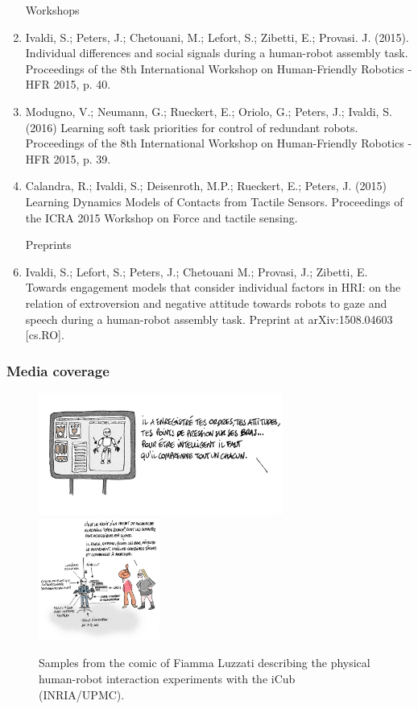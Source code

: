 \begin{enumerate}
\item[Workshops]

\item Ivaldi, S.; Peters, J.;  Chetouani, M.;  Lefort, S.; Zibetti, E.; Provasi. J. (2015). Individual differences and social signals during a human-robot assembly task. Proceedings of the 8th International Workshop on Human-Friendly Robotics - HFR 2015, p. 40.

\item Modugno, V.; Neumann, G.; Rueckert, E.; Oriolo, G.; Peters, J.; Ivaldi, S. (2016) Learning soft task priorities for control of redundant robots. Proceedings of the 8th International Workshop on Human-Friendly Robotics - HFR 2015, p. 39.

\item Calandra, R.; Ivaldi, S.; Deisenroth, M.P.; Rueckert, E.; Peters, J. (2015) Learning Dynamics Models of Contacts from Tactile Sensors. Proceedings of the ICRA 2015 Workshop on Force and tactile sensing.

\item[Preprints]

\item Ivaldi, S.; Lefort, S.; Peters, J.; Chetouani M.; Provasi, J.; Zibetti, E. Towards engagement models that consider individual factors in HRI: on the relation of extroversion and negative attitude towards robots to gaze and speech during a human-robot assembly task. Preprint at arXiv:1508.04603 [cs.RO]. 

\end{enumerate}


	
\subsubsection{Media coverage}

\begin{figure}[!t]
\begin{center}
\includegraphics[height=4cm]{images/comic_fiamma_1.jpg}
\includegraphics[height=4cm]{images/comic_fiamma_2.jpg}
\caption{Samples from the comic of Fiamma Luzzati describing the physical human-robot interaction experiments with the iCub (INRIA/UPMC).}
\label{fig:comicfiamma}
\end{center}
\end{figure}


